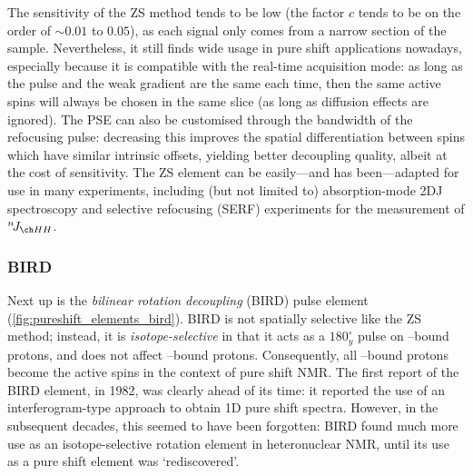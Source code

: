 The sensitivity of the ZS method tends to be low (the factor $c$ tends to be on the order of $\sim 0.01$ to $0.05$), as each signal only comes from a narrow section of the sample.
Nevertheless, it still finds wide usage in pure shift applications nowadays, especially because it is compatible with the real-time acquisition mode\autocite{Meyer2013ACIE}: as long as the pulse and the weak gradient are the same each time, then the same active spins will always be chosen in the same slice (as long as diffusion effects are ignored).
The PSE can also be customised through the bandwidth of the refocusing pulse: decreasing this improves the spatial differentiation between spins which have similar intrinsic offsets, yielding better decoupling quality, albeit at the cost of sensitivity.
The ZS element can be easily---and has been---adapted for use in many experiments, including (but not limited to) absorption-mode 2DJ spectroscopy\autocite{Pell2007JMR} and selective refocusing (SERF) experiments for the measurement of $\nJ{HH}$\autocite{Giraud2010ACIE,Gubensak2014CC,Mishra2017JMR,Buchberger2018MRC}.


\subsubsection{BIRD}

Next up is the \textit{bilinear rotation decoupling} (BIRD) pulse element (\cref{fig:pureshift_elements_bird}).
BIRD is not spatially selective like the ZS method; instead, it is \textit{isotope-selective} in that it acts as a $180^\circ_y$ pulse on \carbon{}--bound protons, and does not affect \carbont{}--bound protons.
Consequently, all \carbon{}--bound protons become the active spins in the context of pure shift NMR.
The first report of the BIRD element\autocite{Garbow1982CPL}, in 1982, was clearly ahead of its time: it reported the use of an interferogram-type approach to obtain 1D pure shift spectra.
However, in the subsequent decades, this seemed to have been forgotten: BIRD found much more use as an isotope-selective rotation element in heteronuclear NMR\autocite{Uhrin1993JMRSA}, until its use as a pure shift element was `rediscovered'\autocite{Sakhaii2009JMR,Aguilar2011ACIE}.

